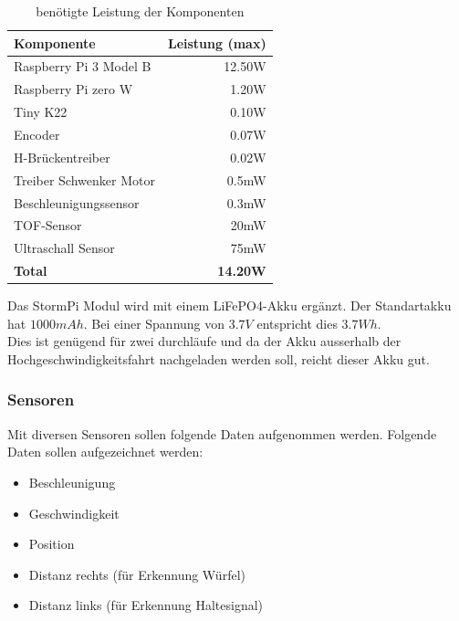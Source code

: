 \documentclass[../../main.tex]{subfiles}
\begin{document}
    \begin{table}[H] \centering
        \begin{tabular}{|l|r|}
        \hline
        \textbf{Komponente}     & \textbf{Leistung (max)} \\ \hline
        Raspberry Pi 3 Model B  & 12.50W \nocite{PiShopPi3ModelBp}                 \\ \hline
        Raspberry Pi zero W     & 1.20W \nocite{RaspiTvPiZeroPower}                   \\ \hline
        Tiny K22                & 0.10W \nocite{K22DataSheet}       \\ \hline
        Encoder                 & 0.07W                   \\ \hline
        H-Brückentreiber        & 0.02W                   \\ \hline
        Treiber Schwenker Motor & 0.5mW                   \\ \hline
        Beschleunigungssensor   & 0.3mW                   \\ \hline
        TOF-Sensor              & 20mW                    \\ \hline
        Ultraschall Sensor      & 75mW                    \\ \hline
        \textbf{Total}          & \textbf{14.20W}         \\ \hline
        \end{tabular}
        \caption{benötigte Leistung der Komponenten}
        \label{tab:et_komponente_leistung}
    \end{table}

    Das StormPi Modul wird mit einem LiFePO4-Akku ergänzt. Der Standartakku hat $1000mAh$. Bei einer Spannung von $3.7V$ entspricht dies $3.7Wh$. \\
    Dies ist genügend für zwei durchläufe und da der Akku ausserhalb der Hochgeschwindigkeitsfahrt nachgeladen werden soll, reicht dieser Akku gut.

    \subsubsection{Sensoren} \label{et_sensoren}
    Mit diversen Sensoren sollen folgende Daten aufgenommen werden. Folgende Daten sollen aufgezeichnet werden:
    \begin{itemize}
        \item Beschleunigung
        \item Geschwindigkeit
        \item Position
        \item Distanz rechts (für Erkennung Würfel)
        \item Distanz links (für Erkennung Haltesignal)
    \end{itemize}
\end{document}
